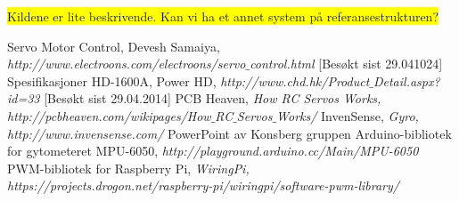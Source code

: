 \colorbox{yellow}{Kildene er lite beskrivende. Kan vi ha et annet system på referansestrukturen?}
\begin{thebibliography}{9}

 \label{ref:PWM} Servo Motor Control, Devesh Samaiya,  \emph{http://www.electroons.com/electroons/servo$\_$control.html} [Besøkt sist 29.041024]
 \label{ref:PowerHD} 
Spesifikasjoner HD-1600A, Power HD, \emph{http://www.chd.hk/Product$\_$Detail.aspx?id=33} [Besøkt sist 29.04.2014]
 \label{ref:SerCtrl} PCB Heaven, \emph{How RC Servos Works, http://pcbheaven.com/wikipages/How$\_$RC$\_$Servos$\_$Works/}
 \label{ref:InSens} InvenSense, \emph{Gyro, http://www.invensense.com/}
 \label{ref:PowerPoint} PowerPoint av Konsberg gruppen
 \label{ref:SerCtrl} Arduino-bibliotek for gytometeret MPU-6050, \emph{http://playground.arduino.cc/Main/MPU-6050}
 \label{ref:SerCtrl} PWM-bibliotek for Raspberry Pi, \emph{WiringPi, https://projects.drogon.net/raspberry-pi/wiringpi/software-pwm-library/}

\end{thebibliography}
